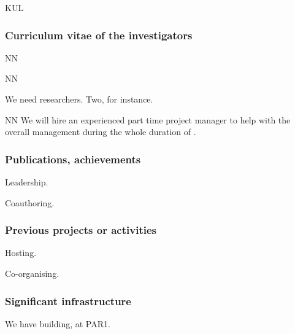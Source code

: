 \begin{sitedescription}{KUL}
\subsubsection*{Curriculum vitae of the investigators}




\begin{participant}[type=res,PM=48,salary=5500]{NN}
\end{participant}
\begin{participant}[type=res,PM=36,salary=5500]{NN}

We need researchers. Two, for instance.

\end{participant}

\begin{participant}[type=res,PM=24,salary=3932]{NN}
  We will hire an experienced part time project manager to help with
  the overall management during the whole duration of \TheProject.
\end{participant}

\subsubsection*{Publications, achievements}

\begin{compactenum}
\item Leadership.
\item Coauthoring.
\end{compactenum}


\subsubsection*{Previous projects or activities}

\begin{compactenum}
\item Hosting.
\item Co-organising.
\end{compactenum}

\subsubsection*{Significant infrastructure}

We have building, at PAR1.

\end{sitedescription}



